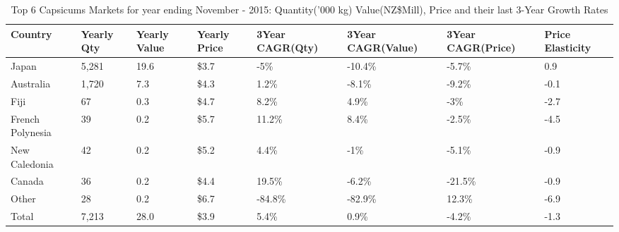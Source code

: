 \begin{table}[ht]
\centering
{\scriptsize
\begin{tabular}[t]{p{1.8cm}>{\hfill}p{1.4cm}>{\hfill}p{1.4cm}>{\hfill}p{1.6cm}>{\hfill}p{1.9cm}>{\hfill}p{2cm}>{\hfill}p{1.9cm}>{\hfill}p{1.5cm}}
 \textbf{Country} & \textbf{Yearly Qty} & \textbf{Yearly Value} & \textbf{Yearly Price} & \textbf{3Year CAGR(Qty)} & \textbf{3Year CAGR(Value)} & \textbf{3Year CAGR(Price)} & \textbf{Price Elasticity} \\
\hline
Japan & 5,281 & 19.6 & \$3.7 & -5\% & -10.4\% & -5.7\% & 0.9 \\  
Australia & 1,720 & 7.3 & \$4.3 & 1.2\% & -8.1\% & -9.2\% & -0.1 \\  
Fiji & 67 & 0.3 & \$4.7 & 8.2\% & 4.9\% & -3\% & -2.7 \\  
French Polynesia & 39 & 0.2 & \$5.7 & 11.2\% & 8.4\% & -2.5\% & -4.5 \\  
New Caledonia & 42 & 0.2 & \$5.2 & 4.4\% & -1\% & -5.1\% & -0.9 \\  
Canada & 36 & 0.2 & \$4.4 & 19.5\% & -6.2\% & -21.5\% & -0.9 \\  
Other & 28 & 0.2 & \$6.7 & -84.8\% & -82.9\% & 12.3\% & -6.9 \\  
Total & 7,213 & 28.0 & \$3.9 & 5.4\% & 0.9\% & -4.2\% & -1.3 \\  
\hline
\end{tabular}
}
\caption{\scriptsize Top 6 Capsicums Markets for year ending November - 2015: Quantity('000 kg) Value(NZ\$Mill), Price and their last 3-Year Growth Rates}
\end{table}

